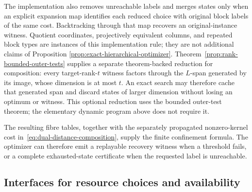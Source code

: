The implementation also removes unreachable labels and merges states only
when an explicit expansion map identifies each reduced choice with original
block labels of the same cost.  Backtracking through that map recovers an
original-instance witness.  Quotient coordinates, projectively equivalent
columns, and repeated block types are instances of this implementation rule;
they are not additional claims of Proposition
\ref{prop:exact-hierarchical-optimizer}.
Theorem~\ref{prop:rank-bounded-outer-tests} supplies a separate
theorem-backed reduction for composition: every target-rank-$t$ witness
factors through the $L$-span generated by its image, whose dimension is at
most $t$.  An exact search may therefore cache that generated span and discard
states of larger dimension without losing an optimum or witness.  This
optional reduction uses the bounded outer-test theorem; the elementary
dynamic program above does not require it.

The resulting fibre tables, together with the separately propagated
nonzero-kernel cost in~\eqref{eq:dual-distance-composition}, supply the
finite confinement formula.
The optimizer can therefore emit a replayable recovery witness when a threshold fails,
or a complete exhausted-state certificate when the requested label is
unreachable.

\subsection{Interfaces for resource choices and availability}

